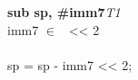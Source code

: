 


\begin{instructionblock}{\imagewidth}%
    \textbf{sub sp, \#imm7}\hfill\textit{T1}\\
    imm7 $\in$ \immSeven\ {<}{<} 2\\
    {}\\
    sp = sp - imm7 {<}{<} 2;
\end{instructionblock}

